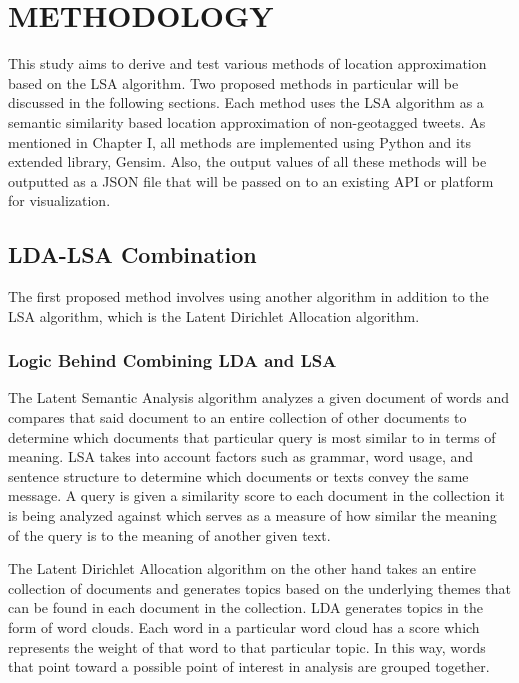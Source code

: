 \chapter{METHODOLOGY}

This study aims to derive and test various methods of location approximation based on the LSA algorithm. Two proposed methods in particular will be discussed in the following sections. Each method uses the LSA algorithm as a semantic similarity based location approximation of non-geotagged tweets.  As mentioned in Chapter I, all methods are implemented using Python and its extended library, Gensim. Also, the output values of all these methods will be outputted as a JSON file that will be passed on to an existing API or platform for visualization. 

\section{LDA-LSA Combination}


The first proposed method involves using another algorithm in addition to the LSA algorithm, which is the Latent Dirichlet Allocation algorithm.

\subsection{Logic Behind Combining LDA and LSA}

The Latent Semantic Analysis algorithm analyzes a given document of words and compares that said document to an entire collection of other documents to determine which documents that particular query is most similar to in terms of meaning. LSA takes into account factors such as grammar, word usage, and sentence structure to determine which documents or texts convey the same message. A query is given a similarity score to each document in the collection it is being analyzed against which serves as a measure of how similar the meaning of the query is to the meaning of another given text. 

The Latent Dirichlet Allocation algorithm on the other hand takes an entire collection of documents and generates topics based on the underlying themes that can be found in each document in the collection. LDA generates topics in the form of word clouds. Each word in a particular word cloud has a score which represents the weight of that word to that particular topic. In this way, words that point toward a possible point of interest in analysis are grouped together. 

